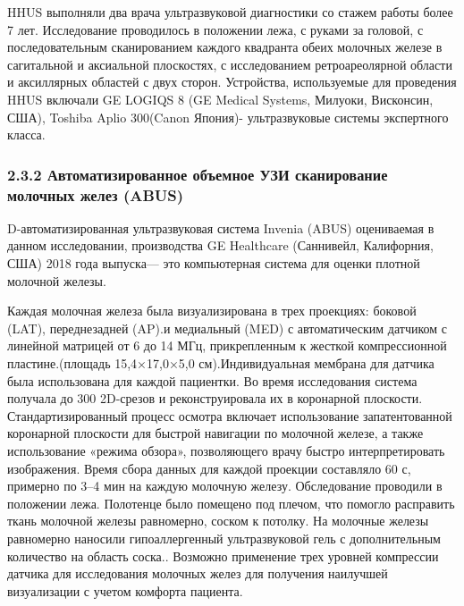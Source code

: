 \documentclass[
]{article}
\begin{document}
HHUS выполняли два врача ультразвуковой диагностики со стажем работы
более 7 лет. Исследование проводилось в положении лежа, с руками за
головой, с последовательным сканированием каждого квадранта обеих
молочных железе в сагитальной и аксиальной плоскостях, с исследованием
ретроареолярной области и аксиллярных областей с двух сторон.
Устройства, используемые для проведения HHUS включали GE LOGIQS 8 (GE
Medical Systems, Милуоки, Висконсин, США), Toshiba Aplio 300(Canon
Япония)- ультразвуковые системы экспертного класса.

\hypertarget{ux430ux432ux442ux43eux43cux430ux442ux438ux437ux438ux440ux43eux432ux430ux43dux43dux43eux435-ux43eux431ux44aux435ux43cux43dux43eux435-ux443ux437ux438-ux441ux43aux430ux43dux438ux440ux43eux432ux430ux43dux438ux435-ux43cux43eux43bux43eux447ux43dux44bux445-ux436ux435ux43bux435ux437-abus}{%
\subsubsection{2.3.2 Автоматизированное объемное УЗИ сканирование
молочных желез
(ABUS)}\label{ux430ux432ux442ux43eux43cux430ux442ux438ux437ux438ux440ux43eux432ux430ux43dux43dux43eux435-ux43eux431ux44aux435ux43cux43dux43eux435-ux443ux437ux438-ux441ux43aux430ux43dux438ux440ux43eux432ux430ux43dux438ux435-ux43cux43eux43bux43eux447ux43dux44bux445-ux436ux435ux43bux435ux437-abus}}

D-автоматизированная ультразвуковая система Invenia (ABUS) оцениваемая в
данном исследовании, производства GE Healthcare (Саннивейл, Калифорния,
США) 2018 года выпуска--- это компьютерная система для оценки плотной
молочной железы.

Каждая молочная железа была визуализирована в трех проекциях: боковой
(LAT), переднезадней (AP).и медиальный (MED) с автоматическим датчиком с
линейной матрицей от 6 до 14 МГц, прикрепленным к жесткой компрессионной
пластине.(площадь 15,4×17,0×5,0 см).Индивидуальная мембрана для датчика
была использована для каждой пациентки. Во время исследования система
получала до 300 2D-срезов и реконструировала их в коронарной плоскости.
Стандартизированный процесс осмотра включает использование
запатентованной коронарной плоскости для быстрой навигации по молочной
железе, а также использование «режима обзора», позволяющего врачу быстро
интерпретировать изображения. Время сбора данных для каждой проекции
составляло 60 с, примерно по 3--4 мин на каждую молочную железу.
Обследование проводили в положении лежа. Полотенце было помещено под
плечом, что помогло расправить ткань молочной железы равномерно, соском
к потолку. На молочные железы равномерно наносили гипоаллергенный
ультразвуковой гель с дополнительным количество на область соска..
Возможно применение трех уровней компрессии датчика для исследования
молочных желез для получения наилучшей визуализации с учетом комфорта
пациента.
\end{document}
